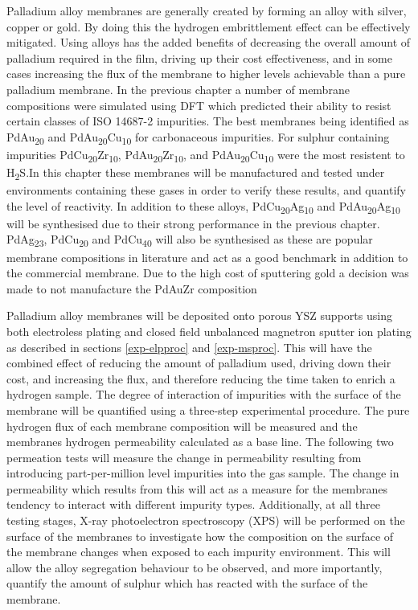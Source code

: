 Palladium alloy membranes are generally created by forming an alloy with silver, copper or gold. By doing this the hydrogen embrittlement effect can be effectively mitigated. Using alloys has the added benefits of decreasing the overall amount of palladium required in the film, driving up their cost effectiveness, and in some cases increasing the flux of the membrane to higher levels achievable than a pure palladium membrane. In the previous chapter a number of membrane compositions were simulated using DFT which predicted their ability to resist certain classes of ISO 14687-2 impurities. The best membranes being identified as PdAu\textsubscript{20} and PdAu\textsubscript{20}Cu\textsubscript{10} for carbonaceous impurities. For sulphur containing impurities PdCu\textsubscript{20}Zr\textsubscript{10}, PdAu\textsubscript{20}Zr\textsubscript{10}, and PdAu\textsubscript{20}Cu\textsubscript{10} were the most resistent to H\textsubscript{2}S.In this chapter these membranes will be manufactured and tested under environments containing these gases in order to verify these results, and quantify the level of reactivity. In addition to these alloys, PdCu\textsubscript{20}Ag\textsubscript{10} and PdAu\textsubscript{20}Ag\textsubscript{10} will be synthesised due to their strong performance in the previous chapter. PdAg\textsubscript{23}, PdCu\textsubscript{20} and PdCu\textsubscript{40} will also be synthesised as these are popular membrane compositions in literature and act as a good benchmark in addition to the commercial membrane. Due to the high cost of sputtering gold a decision was made to not manufacture the PdAuZr composition

Palladium alloy membranes will be deposited onto porous YSZ supports using both electroless plating  and closed field unbalanced magnetron sputter ion plating as described in sections \ref{exp-elpproc} and \ref{exp-msproc}. This will have the combined effect of reducing the amount of palladium used, driving down their cost, and  increasing the flux, and therefore reducing the time taken to enrich a hydrogen sample. The degree of interaction of impurities with the surface of the membrane will be quantified using a three-step experimental procedure. The pure hydrogen flux of each membrane composition will be measured and the membranes hydrogen permeability calculated as a base line. The following two permeation tests will measure the change in permeability resulting from introducing part-per-million level impurities into the gas sample. The change in permeability which results from this will act as a measure for the membranes tendency to interact with different impurity types. Additionally, at all three testing stages, X-ray photoelectron spectroscopy (XPS) will be performed on the surface of the membranes to investigate how the composition on the surface of the membrane changes when exposed to each impurity environment. This will allow the alloy segregation behaviour to be observed, and more importantly, quantify the amount of sulphur which has reacted with the surface of the membrane. 

